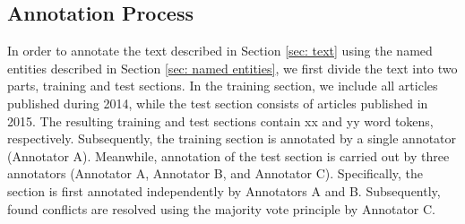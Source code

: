 \documentclass[11pt]{article}
\begin{document}







\subsection{Annotation Process}

In order to annotate the text described in Section \ref{sec: text} using the named entities described in Section \ref{sec: named entities}, we first divide the text into two parts, training and test sections. In the training section, we include all articles published during 2014, while the test section consists of articles published in 2015. The resulting training and test sections contain xx and yy word tokens, respectively. Subsequently, the training section is annotated by a single annotator (Annotator A). Meanwhile, annotation of the test section is carried out by three annotators (Annotator A, Annotator B, and Annotator C). Specifically, the section is first annotated independently by Annotators A and B. Subsequently, found conflicts are resolved using the majority vote principle by Annotator C.
\end{document}
